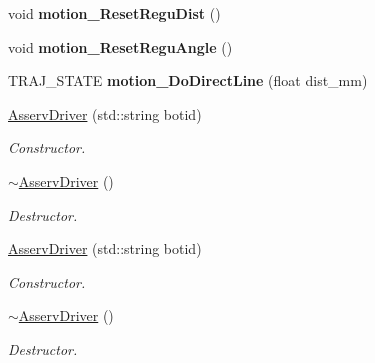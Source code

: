 \begin{DoxyCompactItemize}
\mbox{\label{classAsservDriver_acb84d282c7e0b40d9b326b0fcb7a0c69}} 
void {\bfseries motion\+\_\+\+Reset\+Regu\+Dist} ()
\item 
\mbox{\label{classAsservDriver_acd102376cacdf0fc40a587f25359a25e}} 
void {\bfseries motion\+\_\+\+Reset\+Regu\+Angle} ()
\item 
\mbox{\label{classAsservDriver_a9d967bff5061c791226484bbd998362b}} 
T\+R\+A\+J\+\_\+\+S\+T\+A\+TE {\bfseries motion\+\_\+\+Do\+Direct\+Line} (float dist\+\_\+mm)
\item 
\mbox{\label{classAsservDriver_a2ea943e6faf4d9b6d4c2a61b85849194}} 
\hyperlink{classAsservDriver_a2ea943e6faf4d9b6d4c2a61b85849194}{Asserv\+Driver} (std\+::string botid)
\begin{DoxyCompactList}\small\item\em Constructor. \end{DoxyCompactList}\item 
\mbox{\label{classAsservDriver_a5960b3ced1e727d33ded6ff469fc1a78}} 
\hyperlink{classAsservDriver_a5960b3ced1e727d33ded6ff469fc1a78}{$\sim$\+Asserv\+Driver} ()
\begin{DoxyCompactList}\small\item\em Destructor. \end{DoxyCompactList}\item 
\mbox{\label{classAsservDriver_a2ea943e6faf4d9b6d4c2a61b85849194}} 
\hyperlink{classAsservDriver_a2ea943e6faf4d9b6d4c2a61b85849194}{Asserv\+Driver} (std\+::string botid)
\begin{DoxyCompactList}\small\item\em Constructor. \end{DoxyCompactList}\item 
\mbox{\label{classAsservDriver_a5960b3ced1e727d33ded6ff469fc1a78}} 
\hyperlink{classAsservDriver_a5960b3ced1e727d33ded6ff469fc1a78}{$\sim$\+Asserv\+Driver} ()
\begin{DoxyCompactList}\small\item\em Destructor. \end{DoxyCompactList}\item 

\end{DoxyCompactItemize}
